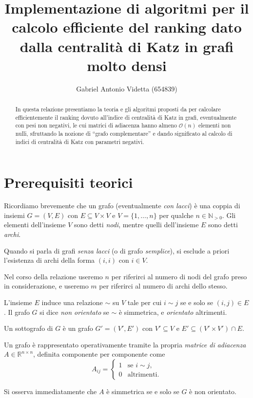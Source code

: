 \documentclass[a4paper]{article}
\title{Implementazione di algoritmi per il calcolo efficiente del ranking dato dalla centralità di Katz in grafi molto densi}
\author{Gabriel Antonio Videtta (\textsc{654839})}
\newcommand{\NNp}{\mathbb{N}_{> 0}}
\newcommand{\RR}{\mathbb{R}}
\newcommand{\se}{\text{se }}
\newcommand{\altrimenti}{\text{altrimenti}}
\newcommand{\OO}{\mathcal{O}}
\begin{document}
\maketitle

\begin{abstract}
In questa relazione presentiamo la teoria e gli algoritmi
proposti da \cite{katz2024} per calcolare efficientemente il ranking dovuto all'indice
di centralità di Katz in grafi, eventualmente con pesi non negativi, le cui matrici di adiacenza
hanno almeno $\OO(n)$ elementi non nulli, sfruttando la nozione di ``grafo complementare''
e dando significato al calcolo di indici di centralità di Katz con parametri
negativi.
\end{abstract}

\section{Prerequisiti teorici}

Ricordiamo brevemente che un grafo (eventualmente \textit{con lacci}) è una coppia di insiemi $G = (V, E)$ con $E \subseteq V \times V$ e $V = \{1, \ldots, n\}$ per qualche $n \in \NNp$. Gli elementi dell'insieme $V$ sono detti \textit{nodi}, mentre quelli dell'insieme $E$ sono detti \textit{archi}.

Quando si parla di grafi \textit{senza lacci} (o di grafo \textit{semplice}), si esclude a priori l'esistenza di archi
della forma $(i, i)$ con $i \in V$.

Nel corso della relazione useremo $n$ per riferirci al numero di
nodi del grafo preso in considerazione, e useremo $m$ per riferirci al
numero di archi dello stesso.

L'insieme $E$ induce una relazione $\sim$ su $V$ tale per cui $i \sim j$ se e solo se $(i, j) \in E$. Il grafo $G$ si dice \textit{non orientato} se $\sim$ è simmetrica, e \textit{orientato} altrimenti.

Un sottografo di $G$ è un grafo $G' = (V', E')$ con $V' \subseteq V$
e $E' \subseteq (V' \times V') \cap E$.

Un grafo è rappresentato operativamente tramite la propria \textit{matrice
di adiacenza} $A \in \RR^{n \times n}$, definita componente per componente come
\[
    A_{ij} = \begin{cases}
        1 & \se i \sim j, \\
        0 & \altrimenti.
    \end{cases}
\]

Si osserva immediatamente che $A$ è simmetrica se e solo se $G$ è non orientato.
\end{document}
